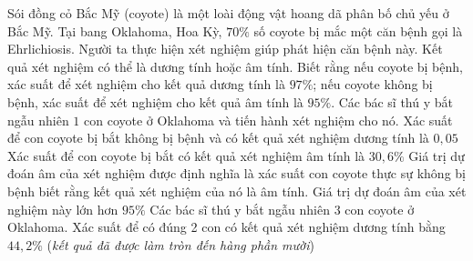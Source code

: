 \begin{ex}%
	Sói đồng cỏ Bắc Mỹ (coyote) là một loài động vật hoang dã phân bố chủ yếu ở Bắc Mỹ. Tại bang Oklahoma, Hoa Kỳ, $70\%$ số coyote bị mắc một căn bệnh gọi là Ehrlichiosis. Người ta thực hiện xét nghiệm giúp phát hiện căn bệnh này. Kết quả xét nghiệm có thể là dương tính hoặc âm tính. Biết rằng nếu coyote bị bệnh, xác suất để xét nghiệm cho kết quả dương tính là $97\%$; nếu coyote không bị bệnh, xác suất để xét nghiệm cho kết quả âm tính là $95\%$. Các bác sĩ thú y bắt ngẫu nhiên $1$ con coyote ở Oklahoma và tiến hành xét nghiệm cho nó.
	\choiceTF
		{Xác suất để con coyote bị bắt không bị bệnh và có kết quả xét nghiệm dương tính là $0{,}05$}
		{\True Xác suất để con coyote bị bắt có kết quả xét nghiệm âm tính là $30{,}6\%$}
		{Giá trị dự đoán âm của xét nghiệm được định nghĩa là xác suất con coyote thực sự không bị bệnh biết rằng kết quả xét nghiệm của nó là âm tính. Giá trị dự đoán âm của xét nghiệm này lớn hơn $95\%$}
		{\True Các bác sĩ thú y bắt ngẫu nhiên $3$ con coyote ở Oklahoma. Xác suất để có đúng 2 con có kết quả xét nghiệm dương tính bằng $44{,}2\%$ ({\it kết quả đã được làm tròn đến hàng phần mười})}
\end{ex}
